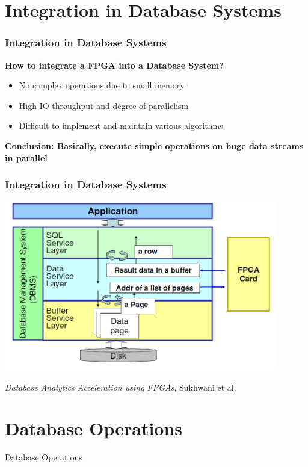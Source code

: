 \documentclass{beamer}
\begin{document}
\section{Integration in Database Systems}
\begin{frame}
	\frametitle{Integration in Database Systems}
	
	\textbf{How to integrate a FPGA into a Database System?}
	\begin{itemize}
		\item No complex operations due to small memory
		\item High IO throughput and degree of parallelism
		\item Difficult to implement and maintain various algorithms
	\end{itemize}
	\vspace*{1cm}
	\textbf{Conclusion: Basically, execute simple operations on huge data streams in parallel}
\end{frame}

\begin{frame}
\frametitle{Integration in Database Systems}
\begin{center}
	\includegraphics[width=0.9\textwidth]{img/integration.PNG}
\end{center}
\begin{center}
	\small \emph{Database Analytics Acceleration using FPGAs}, Sukhwani et al.
\end{center}
\end{frame}

\section{Database Operations}
\begin{frame}
	\begin{center}
		\huge Database Operations
	\end{center}
\end{frame}
\end{document}
